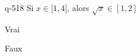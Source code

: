 \begin{truefalse}{q-518}
Si $x\in [1,4[$, alors $\sqrt x \in [1,2]$
\item* Vrai
\item Faux
\end{truefalse}

